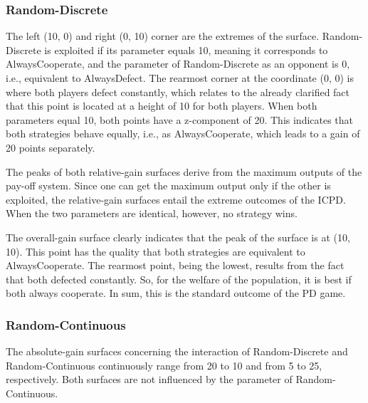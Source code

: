 \documentclass[11pt]{article}
\begin{document}
\subsubsection*{Random-Discrete}
		The left (10, 0) and right (0, 10) corner are the extremes of the surface.
		Random-Discrete is exploited if its parameter equals 10, meaning it corresponds to AlwaysCooperate, and the parameter of Random-Discrete as an opponent is 0, i.e., equivalent to AlwaysDefect.
		The rearmost corner at the coordinate (0, 0) is where both players defect constantly, which relates to the already clarified fact that this point is located at a height of 10 for both players.
		When both parameters equal 10, both points have a z-component of 20.
		This indicates that both strategies behave equally, i.e., as AlwaysCooperate, which leads to a gain of 20 points separately.

		The peaks of both relative-gain surfaces derive from the maximum outputs of the pay-off system.
		Since one can get the maximum output only if the other is exploited, the relative-gain surfaces entail the extreme outcomes of the ICPD.
		When the two parameters are identical, however, no strategy wins.

		The overall-gain surface clearly indicates that the peak of the surface is at (10, 10).
		This point has the quality that both strategies are equivalent to AlwaysCooperate.
		The rearmost point, being the lowest, results from the fact that both defected constantly.
		So, for the welfare of the population, it is best if both always cooperate.
		In sum, this is the standard outcome of the PD game.

\subsubsection*{Random-Continuous}
		The absolute-gain surfaces concerning the interaction of Random-Discrete and Random-Continuous continuously range from 20 to 10 and from 5 to 25, respectively.
		Both surfaces are not influenced by the parameter of Random-Continuous.

\end{document}
